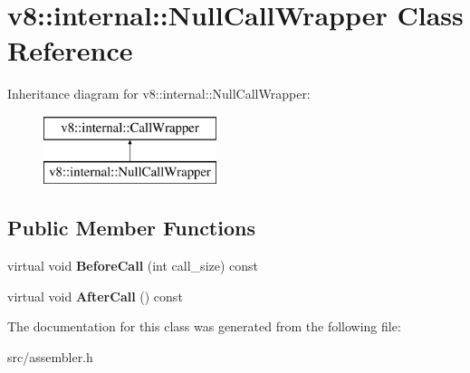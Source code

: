 \hypertarget{classv8_1_1internal_1_1_null_call_wrapper}{}\section{v8\+:\+:internal\+:\+:Null\+Call\+Wrapper Class Reference}
\label{classv8_1_1internal_1_1_null_call_wrapper}
Inheritance diagram for v8\+:\+:internal\+:\+:Null\+Call\+Wrapper\+:\begin{figure}[H]
\begin{center}
\leavevmode
\includegraphics[height=2.000000cm]{classv8_1_1internal_1_1_null_call_wrapper}
\end{center}
\end{figure}
\subsection*{Public Member Functions}
\begin{DoxyCompactItemize}
\item 
\hypertarget{classv8_1_1internal_1_1_null_call_wrapper_a8133e814e321855a1d659ca1b7cf9470}{}virtual void {\bfseries Before\+Call} (int call\+\_\+size) const \label{classv8_1_1internal_1_1_null_call_wrapper_a8133e814e321855a1d659ca1b7cf9470}

\item 
\hypertarget{classv8_1_1internal_1_1_null_call_wrapper_af40a848b231cfb25475917ef17697371}{}virtual void {\bfseries After\+Call} () const \label{classv8_1_1internal_1_1_null_call_wrapper_af40a848b231cfb25475917ef17697371}

\end{DoxyCompactItemize}


The documentation for this class was generated from the following file\+:\begin{DoxyCompactItemize}
\item 
src/assembler.\+h\end{DoxyCompactItemize}
